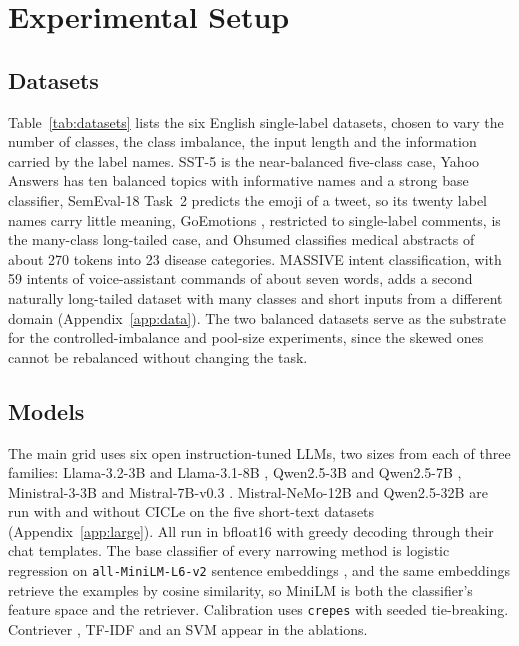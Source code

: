 \section{Experimental Setup}
\label{sec:setup}

\subsection{Datasets}
\label{sec:datasets}

Table~\ref{tab:datasets} lists the six English single-label datasets, chosen to vary the number of classes, the class imbalance, the input length and the information carried by the label names.
SST-5 \citep{socher2013recursive} is the near-balanced five-class case, Yahoo Answers \citep{zhang2015character} has ten balanced topics with informative names and a strong base classifier, SemEval-18 Task~2 \citep{barbieri2018semeval} predicts the emoji of a tweet, so its twenty label names carry little meaning, GoEmotions \citep{demszky2020goemotions}, restricted to single-label comments, is the many-class long-tailed case, and Ohsumed \citep{hersh1994ohsumed} classifies medical abstracts of about 270 tokens into 23 disease categories.
MASSIVE \citep{fitzgerald2023massive} intent classification, with 59 intents of voice-assistant commands of about seven words, adds a second naturally long-tailed dataset with many classes and short inputs from a different domain (Appendix~\ref{app:data}). %
The two balanced datasets serve as the substrate for the controlled-imbalance and pool-size experiments, since the skewed ones cannot be rebalanced without changing the task.



\subsection{Models}
\label{sec:models}

The main grid uses six open instruction-tuned LLMs, two sizes from each of three families: Llama-3.2-3B and Llama-3.1-8B \citep{grattafiori2024llama3}, Qwen2.5-3B and Qwen2.5-7B \citep{qwen2024qwen25}, Ministral-3-3B \citep{mistral2025ministral3} and Mistral-7B-v0.3 \citep{jiang2023mistral7b}. %
Mistral-NeMo-12B \citep{mistralai2024nemo} and Qwen2.5-32B \citep{qwen2024qwen25} are run with and without CICLe on the five short-text datasets (Appendix~\ref{app:large}). %
All run in bfloat16 with greedy decoding through their chat templates.
The base classifier of every narrowing method is logistic regression on \texttt{all-MiniLM-L6-v2} sentence embeddings \citep{reimers2019sentence,wang2020minilm}, and the same embeddings retrieve the examples by cosine similarity, so MiniLM is both the classifier's feature space and the retriever.
Calibration uses \texttt{crepes} \citep{bostrom2022crepes} with seeded tie-breaking.
Contriever \citep{izacard2022unsupervised}, TF-IDF and an SVM appear in the ablations.

